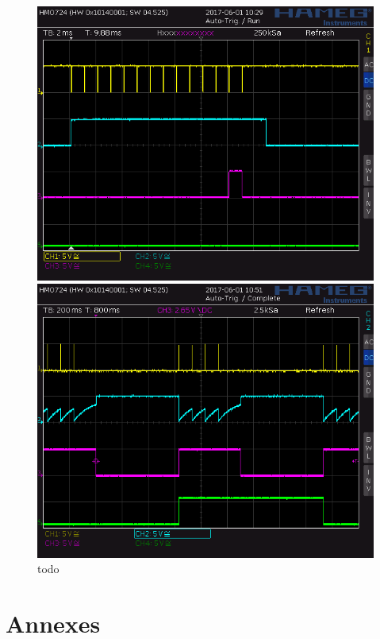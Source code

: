 \documentclass[french]{layout/Report}
\begin{document}
\begin{figure}
\begin{minipage}[b]{0.5\linewidth}
\centering
\includegraphics[width=\textwidth]{../measurements/SCR08}
\end{minipage}
\hspace{0.05cm}
\begin{minipage}[b]{0.5\linewidth}
\centering
\includegraphics[width=\textwidth]{../measurements/SCR12}
\end{minipage}
\caption{todo}
\end{figure}

\section{Annexes}
\end{document}
